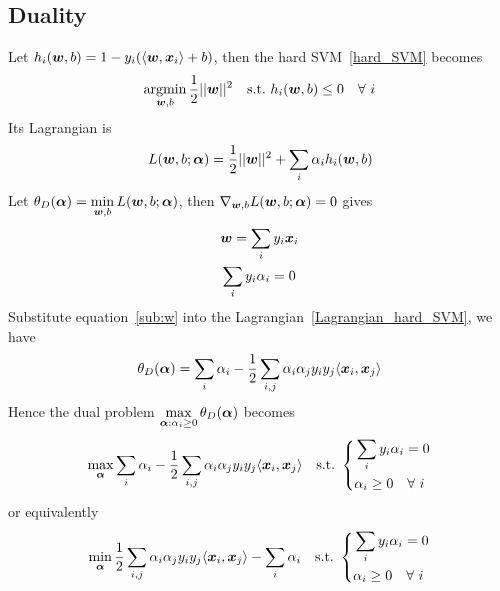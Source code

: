 \subsection{Duality}

Let $h_i(\boldsymbol{w}, b) = 1 - y_i(\langle \boldsymbol{w}, \boldsymbol{x}_i\rangle + b)$, then the hard SVM~\eqref{hard_SVM} becomes
$$\operatorname*{argmin}_{\boldsymbol{w},b} \frac{1}{2}||\boldsymbol{w}||^2\quad\text{s.t.\ } h_i(\boldsymbol{w}, b) \leq 0\quad\forall~i$$
Its Lagrangian is
\begin{equation}\label{Lagrangian_hard_SVM}
    L(\boldsymbol{w}, b; \boldsymbol{\alpha}) = \frac{1}{2}||\boldsymbol{w}||^2 + \sum_i \alpha_i h_i(\boldsymbol{w}, b)
\end{equation}
Let $\displaystyle\theta_D(\boldsymbol{\alpha}) = \min_{\boldsymbol{w}, b}L(\boldsymbol{w}, b; \boldsymbol{\alpha})$, then 
$\nabla_{\boldsymbol{w}, b} L(\boldsymbol{w}, b; \boldsymbol{\alpha}) = 0$ gives
\begin{subequations}
    \begin{align}
    &\boldsymbol{w} = \sum_i y_i \boldsymbol{x}_i\label{sub:w}\\
    &\sum_i y_i \alpha_i = 0\label{sub:b}
    \end{align}
\end{subequations}
Substitute equation~\eqref{sub:w} into the Lagrangian~\eqref{Lagrangian_hard_SVM}, we have
\begin{equation}
    \theta_D(\boldsymbol{\alpha}) = \sum_i \alpha_i - \frac{1}{2}\sum_{i, j}\alpha_i\alpha_j y_i y_j\langle \boldsymbol{x}_i, 
    \boldsymbol{x}_j\rangle
\end{equation}
Hence the dual problem $\displaystyle \max_{\boldsymbol{\alpha}: \alpha_i \geq 0}\theta_D(\boldsymbol{\alpha})$ becomes
\begin{equation*}
    \max_{\boldsymbol{\alpha}}\sum_i \alpha_i - \frac{1}{2}\sum_{i, j}\alpha_i\alpha_j y_i y_j\langle \boldsymbol{x}_i, \boldsymbol{x}_j
    \rangle\quad\text{s.t.\ } \left\{
    \begin{aligned}
    &\sum_i y_i \alpha_i = 0\\
    &\alpha_i \geq 0\quad\forall~i
    \end{aligned}\right.
\end{equation*}
or equivalently
\begin{equation}\label{dual_hard_SVM}
    \min_{\boldsymbol{\alpha}}\frac{1}{2}\sum_{i, j}\alpha_i\alpha_j y_i y_j\langle \boldsymbol{x}_i, \boldsymbol{x}_j\rangle -
    \sum_i \alpha_i \quad\text{s.t.\ } \left\{
    \begin{aligned}
        &\sum_i y_i \alpha_i = 0\\
        &\alpha_i \geq 0\quad\forall~i
        \end{aligned}\right.
\end{equation}
